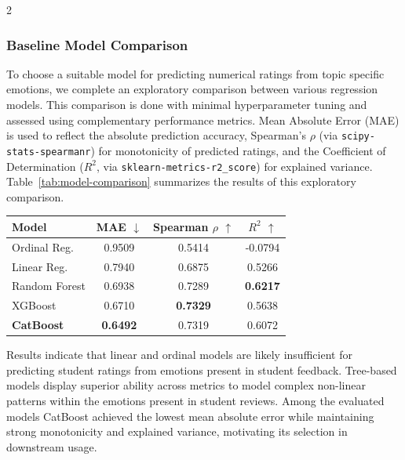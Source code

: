 \documentclass{article}
\begin{document}
\begin{multicols*}{2}
\subsubsection{Baseline Model Comparison}
To choose a suitable model for predicting numerical ratings from topic specific emotions, we complete an exploratory comparison between various regression models. This comparison is done with minimal hyperparameter tuning and assessed using complementary performance metrics. Mean Absolute Error (MAE) is used to reflect the absolute prediction accuracy, Spearman's $\rho$ (via \texttt{scipy-stats-spearmanr}) for monotonicity of predicted ratings, and the Coefficient of Determination ($R^2$, via \texttt{sklearn-metrics-r2\_score}) for explained variance. Table~\ref{tab:model-comparison} summarizes the results of this exploratory comparison.

\begin{center}
    \label{tab:model-comparison}
    \begin{tabular}{lccc}
    \hline
    \textbf{Model} & \textbf{MAE} $\downarrow$ & \textbf{Spearman $\rho$} $\uparrow$ & \textbf{$R^2$} $\uparrow$ \\
    \hline
    Ordinal Reg.       & 0.9509 & 0.5414 & -0.0794 \\
    Linear Reg.        & 0.7940 & 0.6875 & 0.5266 \\
    Random Forest      & 0.6938 & 0.7289 & \textbf{0.6217} \\
    XGBoost            & 0.6710 & \textbf{0.7329} & 0.5638 \\
    \textbf{CatBoost}  & \textbf{0.6492} & 0.7319 & 0.6072 \\
    \hline   
    \end{tabular}
\end{center}

Results indicate that linear and ordinal models are likely insufficient for predicting student ratings from emotions present in student feedback. Tree-based models display superior ability across metrics to model complex non-linear patterns within the emotions present in student reviews. Among the evaluated models CatBoost achieved the lowest mean absolute error while maintaining strong monotonicity and explained variance, motivating its selection in downstream usage.


\end{multicols*}
\end{document}

